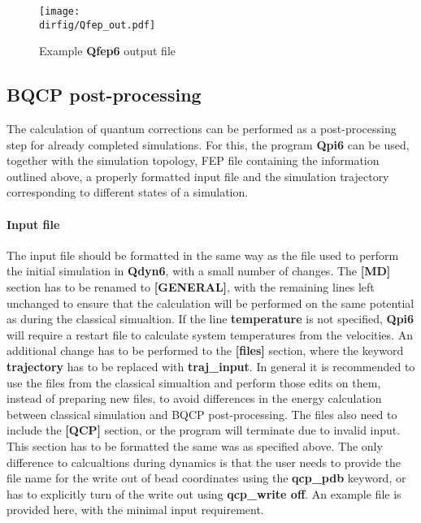 \documentclass[a4paper,11pt]{article}
\newcommand{\dirfig}{./pictures}
\begin{document}
\begin{figure}[h]
\caption{Example \textbf{Qfep6} output file}
\centering
\texttt{[image: \\dirfig/Qfep\_out.pdf]}
\label{fig:Qfep-out}
\end{figure}
\clearpage
\subsection{BQCP post-processing}
\label{section:qpi}
The calculation of quantum corrections can be performed as a post-processing step
for already completed simulations. For this, the program \textbf{Qpi6} can be used,
together with the simulation topology, FEP file containing the information
outlined above, a properly formatted input file and the simulation trajectory 
corresponding to different states of a simulation.

\paragraph{Input file}
The input file should be formatted in the same way as the file used to perform
the initial simulation in \textbf{Qdyn6}, with a small number of changes.
The \textbf{[MD]} section has to be renamed to \textbf{[GENERAL]},
with the remaining lines left unchanged to ensure that the calculation will
be performed on the same potential as during the classical simualtion. If the
line \textbf{temperature} is not specified, \textbf{Qpi6} will require a restart
file to calculate system temperatures from the velocities. An additional 
change has to be performed to the \textbf{[files]} section, where the
keyword \textbf{trajectory} has to be replaced with \textbf{traj{\_}input}.
In general it is recommended to use the files from the classical simualtion and 
perform those edits on them, instead of preparing new files, to avoid differences in
the energy calculation between classical simulation and BQCP post-processing.
The files also need to include the \textbf{[QCP]} section, or the program will
terminate due to invalid input. This section has to be formatted the same
was as specified above. The only difference to calcualtions during dynamics
is that the user needs to provide the file name for the write out of bead
coordinates using the \textbf{qcp{\_}pdb} keyword, or has to 
explicitly turn of the write out using \textbf{qcp{\_}write off}.
An example file is provided here, with the minimal input requirement.
\end{document}
